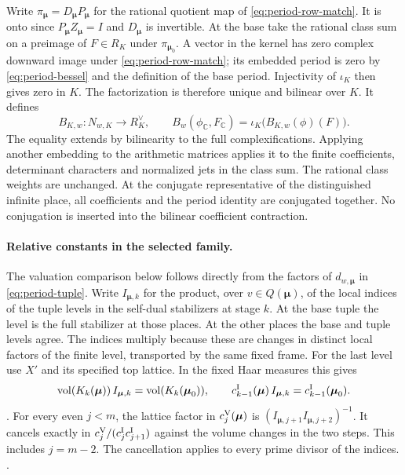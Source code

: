 Write \(\pi_{\boldsymbol\mu}=D_{\boldsymbol\mu}P_{\boldsymbol\mu}\)
for the rational quotient map of \eqref{eq:period-row-match}.
It is onto since \(P_{\boldsymbol\mu}Z_{\boldsymbol\mu}=I\) and
\(D_{\boldsymbol\mu}\) is invertible. At the base take the rational
class sum on a preimage of \(F\in R_K\) under
\(\pi_{\boldsymbol\mu_0}\). A vector in the kernel has zero complex
downward image under \eqref{eq:period-row-match}; its embedded
period is zero by \eqref{eq:period-bessel} and the definition of
the base period. Injectivity of \(\iota_K\) then gives zero in \(K\).
The factorization is therefore unique and bilinear over \(K\).
It defines
\[
 B_{K,w}:N_{w,K}\longrightarrow R_K^\vee,\qquad
 B_w(\phi_{\mathbb C},F_{\mathbb C})
   =\iota_K\bigl(B_{K,w}(\phi)(F)\bigr).
\]
The equality extends by bilinearity to the full complexifications.
Applying another embedding to the arithmetic matrices applies it
to the finite coefficients, determinant characters and normalized
jets in the class sum. The rational class weights are unchanged.
At the conjugate representative of the distinguished infinite
place, all coefficients and the period identity are conjugated
together. No conjugation is inserted into the bilinear coefficient
contraction.

\paragraph{Relative constants in the selected family.}
The valuation comparison below follows directly from the factors
of \(d_{w,\boldsymbol\mu}\) in \eqref{eq:period-tuple}.
Write \(I_{\boldsymbol\mu,k}\) for the product, over
\(v\in Q(\boldsymbol\mu)\), of the local indices of the tuple
levels in the self-dual stabilizers at stage \(k\).
At the base tuple the level is the full stabilizer at those
places. At the other places the base and tuple levels agree.
The indices multiply because these are changes in distinct local
factors of the finite level, transported by the same fixed frame.
For the last level use \(X'\) and its specified top lattice.
In the fixed Haar measures this gives
\[
 \operatorname{vol}(K_k(\boldsymbol\mu))\,I_{\boldsymbol\mu,k}
       =\operatorname{vol}(K_k(\boldsymbol\mu_0)),\qquad
 c^{\rm I}_{k-1}(\boldsymbol\mu)\,I_{\boldsymbol\mu,k}
       =c^{\rm I}_{k-1}(\boldsymbol\mu_0).
\]
.
For every even \(j<m\), the lattice factor in
\(c^{\rm V}_j(\boldsymbol\mu)\) is
\((I_{\boldsymbol\mu,j+1}I_{\boldsymbol\mu,j+2})^{-1}\).
It cancels exactly in \(c^{\rm V}_j/(c^{\rm I}_jc^{\rm I}_{j+1})\)
against the volume changes in the two steps. This includes \(j=m-2\).
The cancellation applies to every prime divisor of the indices.
.

